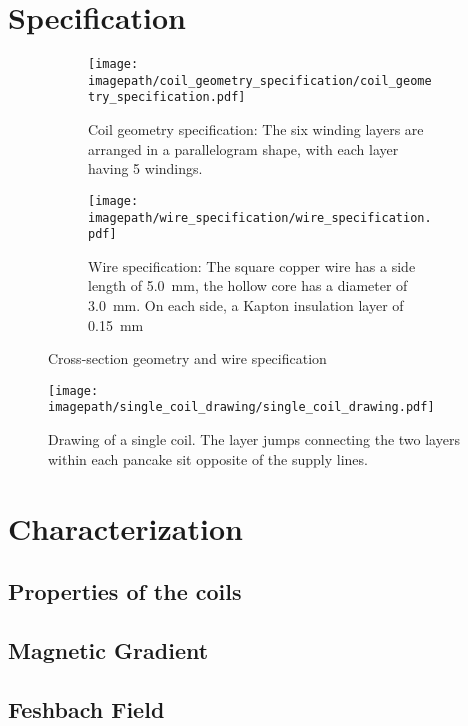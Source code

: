 \section{Specification}
\begin{figure}
    \centering
    \begin{subfigure}[t]{0.45\textwidth}
        \centering
        \texttt{[image: \\imagepath/coil\_geometry\_specification/coil\_geometry\_specification.pdf]}
        \caption{Coil geometry specification: The six winding layers are arranged in a parallelogram shape, with each layer having 5 windings.}
        \label{fig:coil_geometry_specification}
    \end{subfigure}
    \hspace{0.09\textwidth}
    \begin{subfigure}[t]{0.45\textwidth}
        \centering
        \texttt{[image: \\imagepath/wire\_specification/wire\_specification.pdf]}
        \caption{Wire specification: The square copper wire has a side length of \SI{5.0}{\milli\meter}, the hollow core has a diameter of \SI{3.0}{\milli\meter}. On each side, a Kapton insulation layer of \SI{0.15}{\milli\meter} }
        \label{fig:wire_specification}
    \end{subfigure}
    \caption{Cross-section geometry and wire specification}
\end{figure}

\begin{figure}
    \centering
    \texttt{[image: \\imagepath/single\_coil\_drawing/single\_coil\_drawing.pdf]}
    \caption{Drawing of a single coil. The layer jumps connecting the two layers within each pancake sit opposite of the supply lines.} 
    \label{fig:single_coil_drawing}
\end{figure}

\section{Characterization}
\subsection*{Properties of the coils}

\subsection*{Magnetic Gradient}

\subsection*{Feshbach Field} 